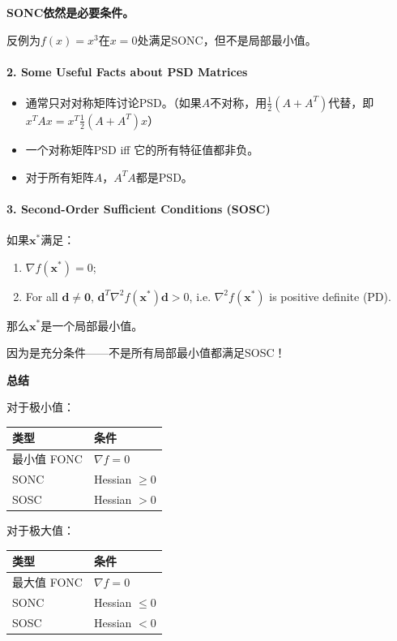 \documentclass[11pt,a4paper]{article}
\providecommand{\tightlist}{\setlength{\itemsep}{0pt}\setlength{\parskip}{0pt}}
\begin{document}
\textbf{SONC依然是必要条件。}

反例为\(f(x) = x^3\)在\(x=0\)处满足SONC，但不是局部最小值。

\paragraph{2. Some Useful Facts about PSD Matrices}\label{some-useful-facts-about-psd-matrices}

\begin{itemize}
\tightlist
\item
  通常只对对称矩阵讨论PSD。（如果\(A\)不对称，用\(\frac{1}{2}(A + A^T)\)代替，即\(x^T A x = x^T \frac{1}{2}(A + A^T) x\)）
\item
  一个对称矩阵PSD iff 它的所有特征值都非负。
\item
  对于所有矩阵\(A\)，\(A^T A\)都是PSD。
\end{itemize}

\paragraph{3. Second-Order Sufficient Conditions (SOSC)}\label{second-order-sufficient-conditions-sosc}

如果$\boldsymbol{x}^*$满足：
\begin{enumerate}
\item $\nabla f(\boldsymbol{x}^*) = 0$;
\item For all $\boldsymbol{d} \neq \mathbf{0}$, $\boldsymbol{d}^T \nabla^2 f(\boldsymbol{x}^*) \boldsymbol{d} > 0$, i.e. $\nabla^2 f(\boldsymbol{x}^*)$ is positive definite (PD).
\end{enumerate}
那么$\boldsymbol{x}^*$是一个局部最小值。

因为是充分条件------不是所有局部最小值都满足SOSC！

\textbf{总结}

对于极小值：
\begin{center}
\begin{tabular}{ll}
\toprule
类型 & 条件 \\
\midrule
最小值 FONC & $\nabla f = 0$ \\
SONC & Hessian $\geq 0$ \\
SOSC & Hessian $> 0$ \\
\bottomrule
\end{tabular}
\end{center}

对于极大值：
\begin{center}
\begin{tabular}{ll}
\toprule
类型 & 条件 \\
\midrule
最大值 FONC & $\nabla f = 0$ \\
SONC & Hessian $\leq 0$ \\
SOSC & Hessian $< 0$ \\
\bottomrule
\end{tabular}
\end{center}
\end{document}
